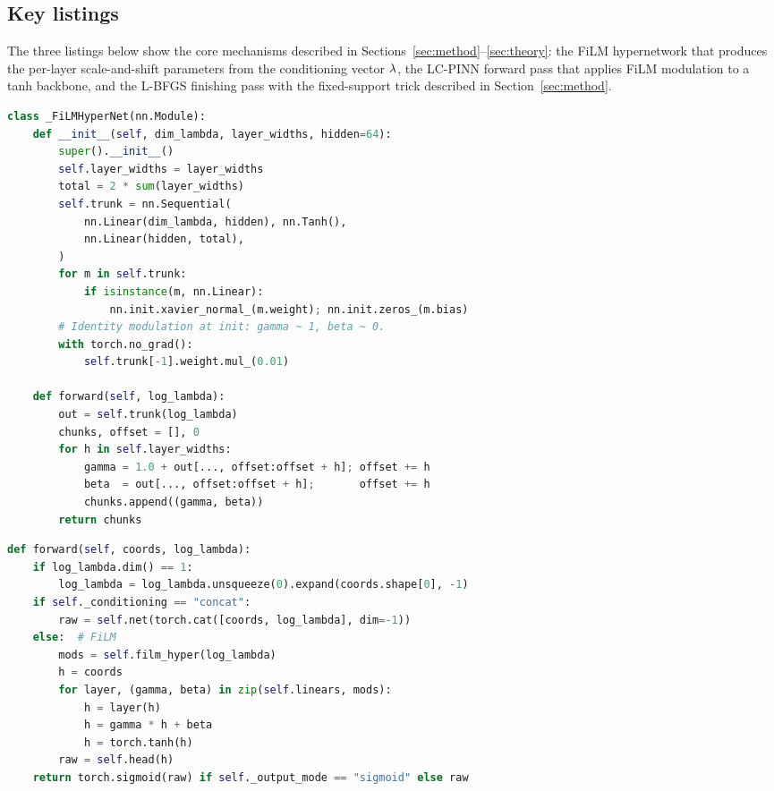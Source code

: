 \documentclass[12pt,a4paper]{extarticle}
\begin{document}
\subsection{Key listings}

The three listings below show the core mechanisms described in Sections~\ref{sec:method}--\ref{sec:theory}: the FiLM hypernetwork that produces the per-layer scale-and-shift parameters from the conditioning vector $\lambda$, the LC-PINN forward pass that applies FiLM modulation to a tanh backbone, and the L-BFGS finishing pass with the fixed-support trick described in Section~\ref{sec:method}.

\begin{lstlisting}[language=Python, caption={FiLM hypernetwork. Produces per-layer $(\gamma_\ell, \beta_\ell)$ from the conditioning vector $\param$, initialised so that $(\gamma, \beta) \approx (1, 0)$ at the start of training.}, label=lst:film]
class _FiLMHyperNet(nn.Module):
    def __init__(self, dim_lambda, layer_widths, hidden=64):
        super().__init__()
        self.layer_widths = layer_widths
        total = 2 * sum(layer_widths)
        self.trunk = nn.Sequential(
            nn.Linear(dim_lambda, hidden), nn.Tanh(),
            nn.Linear(hidden, total),
        )
        for m in self.trunk:
            if isinstance(m, nn.Linear):
                nn.init.xavier_normal_(m.weight); nn.init.zeros_(m.bias)
        # Identity modulation at init: gamma ~ 1, beta ~ 0.
        with torch.no_grad():
            self.trunk[-1].weight.mul_(0.01)

    def forward(self, log_lambda):
        out = self.trunk(log_lambda)
        chunks, offset = [], 0
        for h in self.layer_widths:
            gamma = 1.0 + out[..., offset:offset + h]; offset += h
            beta  = out[..., offset:offset + h];       offset += h
            chunks.append((gamma, beta))
        return chunks
\end{lstlisting}

\begin{lstlisting}[language=Python, caption={LC-PINN forward pass under FiLM conditioning. The backbone is an MLP with tanh activations; at each hidden layer the pre-activation is scale-and-shifted by $(\gamma_\ell, \beta_\ell)$ emitted by the hypernetwork.}, label=lst:lcpinn]
def forward(self, coords, log_lambda):
    if log_lambda.dim() == 1:
        log_lambda = log_lambda.unsqueeze(0).expand(coords.shape[0], -1)
    if self._conditioning == "concat":
        raw = self.net(torch.cat([coords, log_lambda], dim=-1))
    else:  # FiLM
        mods = self.film_hyper(log_lambda)
        h = coords
        for layer, (gamma, beta) in zip(self.linears, mods):
            h = layer(h)
            h = gamma * h + beta
            h = torch.tanh(h)
        raw = self.head(h)
    return torch.sigmoid(raw) if self._output_mode == "sigmoid" else raw
\end{lstlisting}
\end{document}
